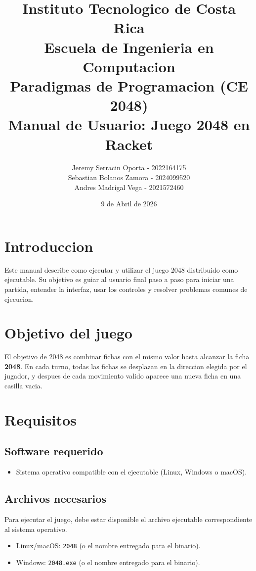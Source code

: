 \documentclass[12pt,a4paper]{article}
\title{
	\textbf{Instituto Tecnologico de Costa Rica} \\
	\large Escuela de Ingenieria en Computacion \\
	\large Paradigmas de Programacion (CE 2048) \\
	\vspace{0.5cm}
	\Large \textbf{Manual de Usuario: Juego 2048 en Racket}
}
\author{Jeremy Serracin Oporta - 2022164175 \\
Sebastian Bolanos Zamora - 2024099520 \\
Andres Madrigal Vega - 2021572460}
\date{9 de Abril de 2026}
\begin{document}
\maketitle
\thispagestyle{empty}

\tableofcontents
\newpage

\section{Introduccion}

Este manual describe como ejecutar y utilizar el juego 2048 distribuido como ejecutable.
Su objetivo es guiar al usuario final paso a paso para iniciar una partida, entender
la interfaz, usar los controles y resolver problemas comunes de ejecucion.

\section{Objetivo del juego}

El objetivo de 2048 es combinar fichas con el mismo valor hasta alcanzar la ficha \textbf{2048}.
En cada turno, todas las fichas se desplazan en la direccion elegida por el jugador, y despues
de cada movimiento valido aparece una nueva ficha en una casilla vacia.

\section{Requisitos}

\subsection{Software requerido}
\begin{itemize}
	\item Sistema operativo compatible con el ejecutable (Linux, Windows o macOS).
\end{itemize}

\subsection{Archivos necesarios}
Para ejecutar el juego, debe estar disponible el archivo ejecutable correspondiente al sistema operativo.
\begin{itemize}
	\item Linux/macOS: \texttt{2048} (o el nombre entregado para el binario).
	\item Windows: \texttt{2048.exe} (o el nombre entregado para el binario).
\end{itemize}
\end{document}
